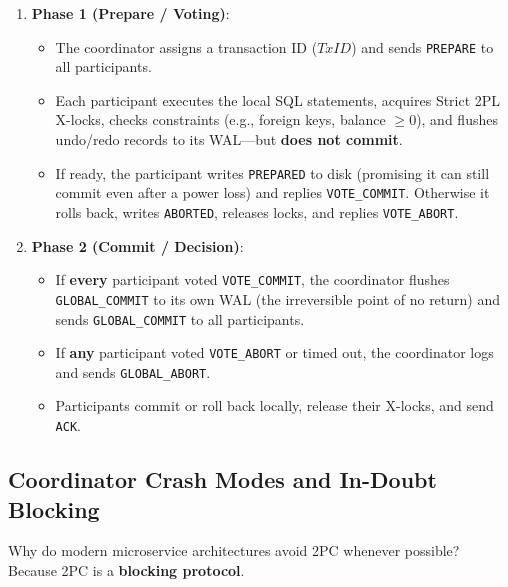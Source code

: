 \begin{enumerate}[leftmargin=18pt]
  \item \textbf{Phase 1 (Prepare / Voting)}:
  \begin{itemize}[leftmargin=12pt]
    \item The coordinator assigns a transaction ID ($TxID$) and sends \texttt{PREPARE} to all participants.
    \item Each participant executes the local SQL statements, acquires Strict 2PL X-locks, checks constraints (e.g., foreign keys, balance $\ge 0$), and flushes undo/redo records to its WAL---but \textbf{does not commit}.
    \item If ready, the participant writes \texttt{PREPARED} to disk (promising it can still commit even after a power loss) and replies \texttt{VOTE\_COMMIT}. Otherwise it rolls back, writes \texttt{ABORTED}, releases locks, and replies \texttt{VOTE\_ABORT}.
  \end{itemize}
  \item \textbf{Phase 2 (Commit / Decision)}:
  \begin{itemize}[leftmargin=12pt]
    \item If \textbf{every} participant voted \texttt{VOTE\_COMMIT}, the coordinator flushes \texttt{GLOBAL\_COMMIT} to its own WAL (the irreversible point of no return) and sends \texttt{GLOBAL\_COMMIT} to all participants.
    \item If \textbf{any} participant voted \texttt{VOTE\_ABORT} or timed out, the coordinator logs and sends \texttt{GLOBAL\_ABORT}.
    \item Participants commit or roll back locally, release their X-locks, and send \texttt{ACK}.
  \end{itemize}
\end{enumerate}

\subsection{Coordinator Crash Modes and In-Doubt Blocking}

Why do modern microservice architectures avoid 2PC whenever possible? Because 2PC is a \textbf{blocking protocol}.

